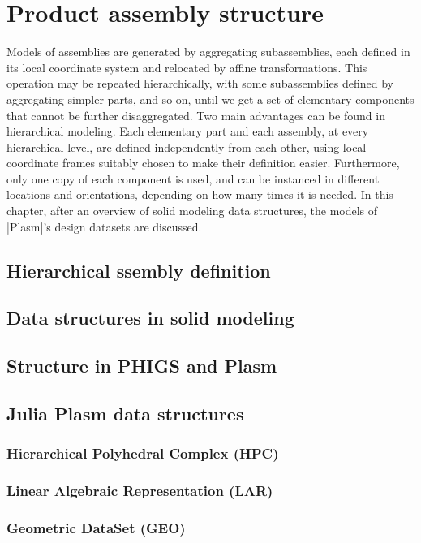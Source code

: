 
\chapter{Product assembly structure}
\label{chapt:6}

Models of assemblies are generated by aggregating subassemblies, each defined in its local coordinate system and relocated by affine transformations. This operation may be repeated hierarchically, with some subassemblies defined by aggregating simpler parts, and so on, until we get a set of elementary components that cannot be further disaggregated.
Two main advantages can be found in hierarchical modeling. Each elementary part and each assembly, at every hierarchical level, are defined independently from each other, using local coordinate frames suitably chosen to make their definition easier. Furthermore, only one copy of each component is used, and can be instanced in different locations and orientations, depending on how many times it is needed. In this chapter, after an overview of solid modeling data structures, the models of |Plasm|’s design datasets are discussed. 


\section{Hierarchical ssembly definition}\label{sect:6-1}


\section{Data structures in solid modeling}\label{sect:6-2}


\section{Structure in PHIGS and Plasm}\label{sect:6-3}


\section{Julia Plasm data structures}\label{sect:6-4}


\subsection{Hierarchical Polyhedral Complex (HPC)}\label{sect:6-4-1}


\subsection{Linear Algebraic Representation (LAR)}\label{sect:6-4-2}


\subsection{Geometric DataSet (GEO)}\label{sect:7-4-3}


